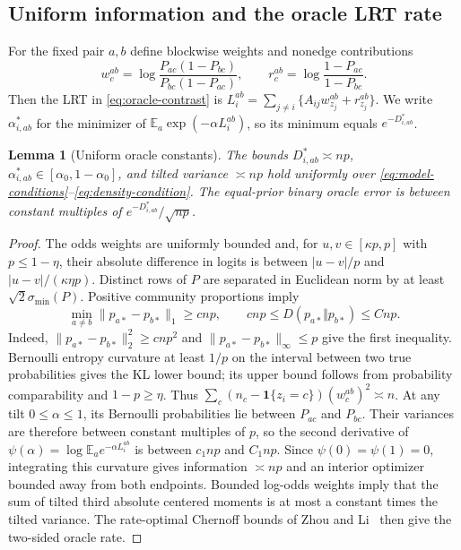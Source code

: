\documentclass[11pt]{article}
\newtheorem{lemma}[theorem]{Lemma}
\theoremstyle{definition}
\theoremstyle{remark}
\newcommand{\E}{\mathbb E}
\newcommand{\one}{\mathbf 1}
\numberwithin{equation}{section}
\begin{document}
\subsection{Uniform information and the oracle LRT rate}
\label{app:uniform-density-bounds}
For the fixed pair $a,b$ define blockwise weights and nonedge contributions
\[
 w_c^{ab}=\log\frac{P_{ac}(1-P_{bc})}{P_{bc}(1-P_{ac})},\qquad
 r_c^{ab}=\log\frac{1-P_{ac}}{1-P_{bc}}.
\]
Then the LRT in \eqref{eq:oracle-contrast} is
$L_i^{ab}=\sum_{j\ne i}\{A_{ij}w_{z_j}^{ab}+r_{z_j}^{ab}\}$.
We write $\alpha^*_{i,ab}$ for the minimizer of
$\E_a\exp(-\alpha L_i^{ab})$, so its minimum equals $e^{-D^*_{i,ab}}$.

\begin{lemma}[Uniform oracle constants]\label{lem:oracle}
The bounds $D^*_{i,ab}\asymp np$, $\alpha^*_{i,ab}\in[\alpha_0,1-\alpha_0]$, and tilted variance $\asymp np$ hold uniformly over \eqref{eq:model-conditions}--\eqref{eq:density-condition}. The equal-prior binary oracle error is between constant multiples of $e^{-D^*_{i,ab}}/\sqrt{np}$.
\end{lemma}
\begin{proof}
The odds weights are uniformly bounded and, for $u,v\in[\kappa p,p]$ with $p\le1-\eta$, their absolute difference in logits is between $|u-v|/p$ and $|u-v|/(\kappa\eta p)$. Distinct rows of $P$ are separated in Euclidean norm by at least $\sqrt{2}\sigma_{\min}(P)$. Positive community proportions imply
\begin{equation}
 \min_{a\ne b}\|p_{a*}-p_{b*}\|_1\ge cnp,
 \qquad cnp\le D(p_{a*}\Vert p_{b*})\le Cnp.
 \label{eq:uniform-information-scale}
\end{equation}
Indeed, $\|p_{a*}-p_{b*}\|_2^2\ge cnp^2$ and
$\|p_{a*}-p_{b*}\|_\infty\le p$ give the first inequality. Bernoulli entropy curvature at least $1/p$ on the interval between two true probabilities gives the KL lower bound; its upper bound follows from probability comparability and $1-p\ge\eta$. Thus $\sum_c(n_c-\one\{z_i=c\})(w_c^{ab})^2\asymp n$. At any tilt $0\le\alpha\le1$, its Bernoulli probabilities lie between $P_{ac}$ and $P_{bc}$. Their variances are therefore between constant multiples of $p$, so the second derivative of $\psi(\alpha)=\log\E_a e^{-\alpha L_i^{ab}}$ is between $c_1np$ and $C_1np$. Since $\psi(0)=\psi(1)=0$, integrating this curvature gives information $\asymp np$ and an interior optimizer bounded away from both endpoints. Bounded log-odds weights imply that the sum of tilted third absolute centered moments is at most a constant times the tilted variance. The rate-optimal Chernoff bounds of Zhou and Li~\citep{zhouli2020} then give the two-sided oracle rate.
\end{proof}
\end{document}
